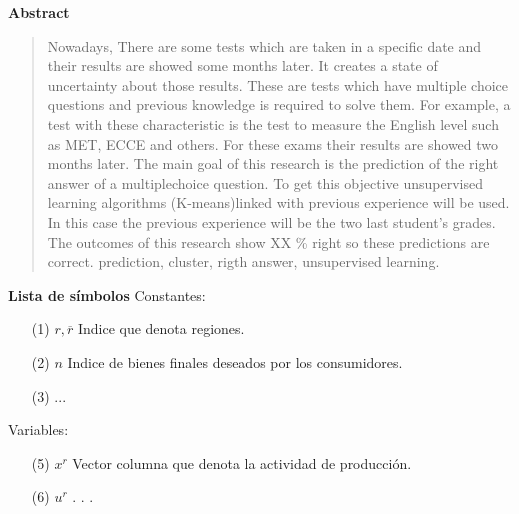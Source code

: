 \newpage
\begin{center}
 {\bf\LARGE Abstract}\vskip 1.5cm
\end{center} 
\begin{quotation}

Nowadays, There are some tests which are taken in a specific date and their results are showed some months later. It creates a state of uncertainty about those results. These are tests which have multiple choice questions and previous knowledge is required to solve them. For example, a test with these characteristic is the test to measure the English level such as MET, ECCE and others. For these exams their results are showed two months later. 
\vskip 0.2cm
The main goal of this research is the prediction of the right answer of a multiplechoice question. To get this objective unsupervised learning algorithms (K-means)linked with previous experience will be used. In this case the previous experience will be the two last student’s grades.
The outcomes of this research show XX \% right so these predictions are correct.
\vskip 0.3cm
\hspace*{-0.6cm}{\bf Keywords:} prediction, cluster, rigth answer, unsupervised learning.
\end{quotation}


\newpage
{}
 {\bf\LARGE Lista de símbolos}
 \vskip 1.5cm
Constantes: 
\begin{enumerate}
\item[(1)]$r,\overline{r} $ \hspace*{0.8cm} Indice que denota regiones.
\item[(2)] $n $ \hspace*{1.1cm} Indice de bienes finales deseados por los consumidores.
\item[(3)] ...
\vskip 3cm
\end{enumerate} 
\vskip 0.3cm
Variables:
\begin{enumerate}
\item[(5)] $ x^{r} $ \hspace*{1cm} Vector columna que denota la actividad de producción.
\item[(6)] $ u^{r} $ \hspace*{1.2cm} . . .
\end{enumerate}

